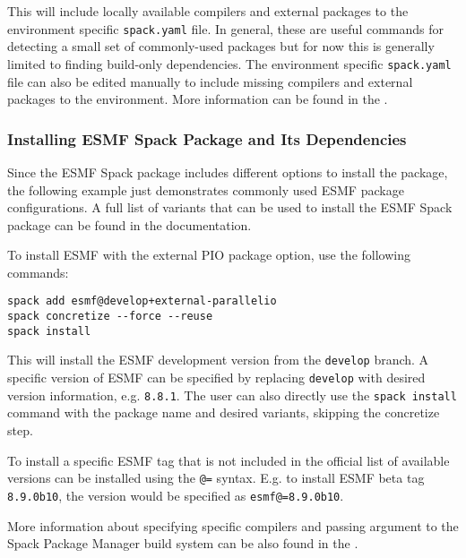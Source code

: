 This will include locally available compilers and external packages to the environment specific {\tt spack.yaml} file. In general, these are useful commands for detecting a small set of commonly-used packages but for now this is generally limited to finding build-only dependencies. The environment specific {\tt spack.yaml} file can also be edited manually to include missing compilers and external packages to the environment. More information can be found in the .

\subsubsection{Installing ESMF Spack Package and Its Dependencies}

Since the ESMF Spack package includes different options to install the package, the following example just demonstrates commonly used ESMF package configurations. A full list of variants that can be used to install the ESMF Spack package can be found in the  documentation.

To install ESMF with the external PIO package option, use the following commands:

\begin{verbatim}
spack add esmf@develop+external-parallelio
spack concretize --force --reuse
spack install
\end{verbatim}

This will install the ESMF development version from the {\tt develop} branch. A specific version of ESMF can be specified by replacing {\tt develop} with desired version information, e.g. {\tt 8.8.1}. The user can also directly use  the {\tt spack install} command with the package name and desired variants, skipping the concretize step.

To install a specific ESMF tag that is not included in the official list of available versions can be installed using the {\tt @=} syntax. E.g. to install ESMF beta tag {\tt 8.9.0b10}, the version would be specified as {\tt esmf@=8.9.0b10}.

More information about specifying specific compilers and passing argument to the Spack Package Manager build system can be also found in the .
